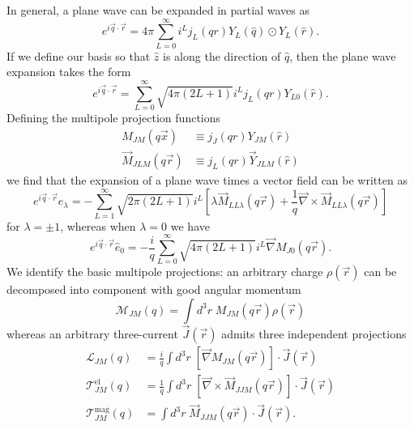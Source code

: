 \documentclass[12pt,letterpaper]{book}
\begin{document}
In general, a plane wave can be expanded in partial waves as
\begin{equation}
e^{i\vec{q}\cdot\vec{r}}=4\pi \sum_{L=0}^{\infty}i^Lj_L(qr)Y_L(\hat{q})\odot Y_L(\hat{r}).
\end{equation}
If we define our basis so that $\hat{z}$ is along the direction of $\hat{q}$, then the plane wave expansion takes the form
\begin{equation}
e^{i\vec{q}\cdot\vec{r}}=\sum_{L=0}^{\infty}\sqrt{4\pi(2L+1)}i^Lj_L(qr)Y_{L0}(\hat{r}).
\end{equation}
Defining the multipole projection functions
\begin{equation}
\begin{split}
M_{JM}(q\vec{x})&\equiv j_J(qr)Y_{JM}(\hat{r})\\
\vec{M}_{JLM}(q\vec{r})&\equiv j_L(qr)\vec{Y}_{JLM}(\hat{r})
\end{split}
\end{equation}
we find that the expansion of a plane wave times a vector field can be written as
\begin{equation}
e^{i\vec{q}\cdot\vec{r}}\hat{e}_{\lambda}=-\sum_{L=1}^{\infty}\sqrt{2\pi(2L+1)}i^L\left[\lambda \vec{M}_{LL\lambda}(q\vec{r})+\frac{1}{q}\vec{\nabla}\times\vec{M}_{LL\lambda}(q\vec{r})\right]
\end{equation}
for $\lambda = \pm 1$, whereas when $\lambda = 0$ we have
\begin{equation}
e^{i\vec{q}\cdot\vec{r}}\hat{e}_0=-\frac{i}{q}\sum_{L=0}^{\infty}\sqrt{4\pi(2L+1)}i^L\vec{\nabla}M_{J0}(q\vec{r}).
\end{equation}
We identify the basic multipole projections: an arbitrary charge $\rho(\vec{r})$ can be decomposed into component with good angular momentum
\begin{equation}
\mathcal{M}_{JM}(q)=\int d^3r\;M_{JM}(q\vec{r})\rho(\vec{r})
\end{equation}
whereas an arbitrary three-current $\vec{J}(\vec{r})$ admits three independent projections 
\begin{equation}
\begin{split}
\mathcal{L}_{JM}(q)&=\frac{i}{q}\int d^3r\;\left[\vec{\nabla}M_{JM}(q\vec{r})\right]\cdot\vec{J}(\vec{r})\\
\mathcal{T}^\mathrm{el}_{JM}(q)&=\frac{1}{q}\int d^3r\;\left[\vec{\nabla}\times\vec{M}_{JJM}(q\vec{r})\right]\cdot\vec{J}(\vec{r})\\
\mathcal{T}^\mathrm{mag}_{JM}(q)&=\int d^3r\;\vec{M}_{JJM}(q\vec{r})\cdot\vec{J}(\vec{r}).
\end{split}
\end{equation}
\end{document}
